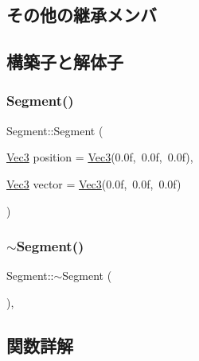 \subsection*{その他の継承メンバ}


\subsection{構築子と解体子}
\mbox{\label{class_segment_af491ed36fc8467aaaf503ba1053b85fd}} 
\subsubsection{\texorpdfstring{Segment()}{Segment()}}
{\footnotesize\ttfamily Segment\+::\+Segment (\begin{DoxyParamCaption}\item[{\mbox{\hyperlink{_vector3_d_8h_ab16f59e4393f29a01ec8b9bbbabbe65d}{Vec3}}}]{position = {\ttfamily \mbox{\hyperlink{_vector3_d_8h_ab16f59e4393f29a01ec8b9bbbabbe65d}{Vec3}}(0.0f,~0.0f,~0.0f)},  }\item[{\mbox{\hyperlink{_vector3_d_8h_ab16f59e4393f29a01ec8b9bbbabbe65d}{Vec3}}}]{vector = {\ttfamily \mbox{\hyperlink{_vector3_d_8h_ab16f59e4393f29a01ec8b9bbbabbe65d}{Vec3}}(0.0f,~0.0f,~0.0f)} }\end{DoxyParamCaption})\hspace{0.3cm}{\ttfamily [inline]}}

\mbox{\label{class_segment_a76b45a453304f1f485e3bc2fcad58b59}} 
\subsubsection{\texorpdfstring{$\sim$\+Segment()}{~Segment()}}
{\footnotesize\ttfamily Segment\+::$\sim$\+Segment (\begin{DoxyParamCaption}{ }\end{DoxyParamCaption})\hspace{0.3cm}{\ttfamily [inline]}, {\ttfamily [virtual]}}



\subsection{関数詳解}
\mbox{\label{class_segment_a4223e990a42cc9e487ef51b82e63e777}} 
